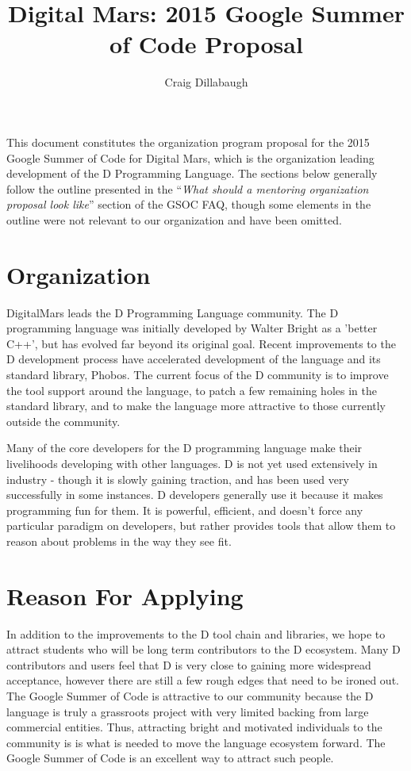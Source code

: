 \documentclass[	DIV=calc,paper=a4,fontsize=11pt,twocolumn]{scrartcl}	%
\title{Digital Mars: 2015 Google Summer of Code Proposal}					%
\author{Craig Dillabaugh }											%
\date{}
\begin{document}
\maketitle

This document constitutes the organization program proposal for the
2015 Google Summer of Code for Digital Mars, which is the organization
leading development of the D Programming Language. The sections below
generally follow the outline presented in the ``\emph{What should a mentoring
organization proposal look like}'' section of the GSOC FAQ, though some 
elements in the outline were not relevant to our organization and have
been omitted.

\section{Organization}

DigitalMars leads the D Programming Language community.   The D programming
language was initially developed by Walter Bright as a 'better C++', but
has evolved far beyond its original goal.
Recent improvements to 
the D development process have accelerated development of the language and
its standard library, Phobos.
The 
current focus of the D community is to improve the tool support around the 
language, to patch a few remaining holes in the standard library, and to make 
the language more attractive to those currently outside the community.  

Many of the core developers for the D programming language make their 
livelihoods developing with other languages.  D is not yet used extensively
in industry - though it is slowly gaining traction, and has been used very 
successfully in some instances.
D developers generally use it because it makes programming fun for them.  
It is 
powerful, efficient, and doesn't force any particular paradigm on developers,
but rather provides tools that allow them to reason about problems in the way 
they see fit.


\section{Reason For Applying}

In addition to the improvements to the D tool chain and libraries, we 
hope to attract students who will be long term contributors to the D ecosystem.
Many D contributors and users feel that D is very close to gaining more
widespread acceptance, however there are still a few rough edges that
need to be ironed out. 
The Google Summer of Code is attractive to our community because the D 
language is truly a grassroots project with very limited backing from 
large commercial entities.  
Thus, attracting bright and motivated individuals to the community is
is what is needed to move the language ecosystem forward.
The Google Summer of Code is an excellent way to attract such people.
\end{document}
